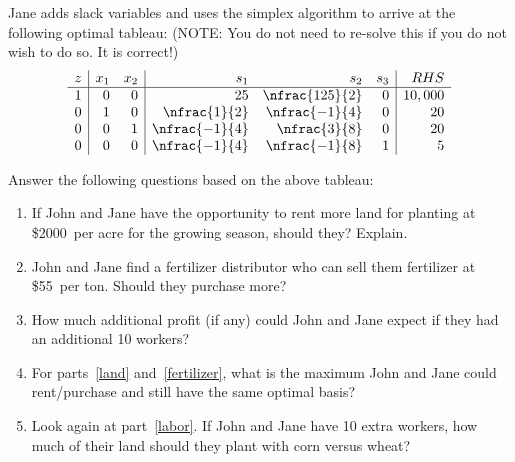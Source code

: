 \begin{enumerate}
  Jane adds slack variables and uses the simplex algorithm to arrive at the following optimal
  tableau: (NOTE: You do not need to re-solve this if you do not wish to do so.  It is
  correct!)\\
  \begin{equation*}
    \begin{array}{r|rr|rrr|r}
	z &x_1&x_2& s_1 & s_2    &s_3&RHS \\ \hline
	1 & 0 & 0 &          25  & \nfrac{125}{2} & 0 & 10,000 \\ %
	0 & 1 & 0 &\nfrac{ 1}{2} & \nfrac{-1}{4}  & 0 &     20 \\
	0 & 0 & 1 &\nfrac{-1}{4} & \nfrac{ 3}{8}  & 0 &     20 \\
	0 & 0 & 0 &\nfrac{-1}{4} & \nfrac{-1}{8}  & 1 &      5 
    \end{array}
  \end{equation*}

  Answer the following questions based on the above tableau:
  \begin{enumerate}
    \item If John and Jane have the opportunity to rent more land for
      planting at \$2000~per acre for the growing season, should they?
      Explain.\label{land}
    \item John and Jane find a fertilizer distributor who can sell them
      fertilizer at \$55~per ton.  Should they purchase more?\label{fertilizer}
    \item How much additional profit (if any) could John and Jane expect if
      they had an additional 10 workers?\label{labor}
    \item For parts~\ref{land} and~\ref{fertilizer}, what
      is the maximum John and Jane could rent/purchase and still have the same
      optimal basis?
    \item Look again at part~\ref{labor}.  If John and
      Jane have 10 extra workers, how much of their land should they plant
      with corn versus wheat?
  \end{enumerate}


\end{enumerate}

